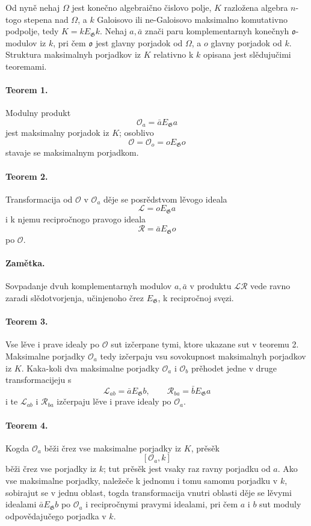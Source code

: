 \documentclass[11pt]{article}
\providecommand{\Gg}{\mathfrak G}
\providecommand{\oo}{\mathfrak o}
\begin{document}
Od nyně nehaj \(\Omega\) jest konečno algebraično čislovo polje, \(K\) razložena algebra \(n\)-togo stepena nad \(\Omega\), a \(k\) Galoisovo ili ne-Galoisovo maksimalno komutativno podpolje, tedy \(K=kE_\Gg k\). Nehaj \(a,\bar a\) znači paru komplementarnyh konečnyh \(\oo\)-modulov iz \(k\), pri čem \(\oo\) jest glavny porjadok od \(\Omega\), a \(o\) glavny porjadok od \(k\). Struktura maksimalnyh porjadkov iz \(K\) relativno k \(k\) opisana jest slědujučimi teoremami.

\paragraph{Teorem 1.}
Modulny produkt
\[
        \mathcal O_a=\bar a E_\Gg a
\]
jest maksimalny porjadok iz \(K\); osoblivo
\[
        \mathcal O=\mathcal O_o=oE_\Gg o
\]
stavaje se maksimalnym porjadkom.

\paragraph{Teorem 2.}
Transformacija od \(\mathcal O\) v \(\mathcal O_a\) děje se posrědstvom lěvogo ideala
\[
        \mathcal L=oE_\Gg a
\]
i k njemu recipročnogo pravogo ideala
\[
        \mathcal R=\bar a E_\Gg o
\]
po \(\mathcal O\).

\paragraph{Zamětka.}
Sovpadanje dvuh komplementarnyh modulov \(a,\bar a\) v produktu \(\mathcal L\mathcal R\) vede ravno zaradi slědotvorjenja, učinjenoho črez \(E_\Gg\), k recipročnoj svęzi.

\paragraph{Teorem 3.}
Vse lěve i prave idealy po \(\mathcal O\) sut izčerpane tymi, ktore ukazane sut v teoremu 2. Maksimalne porjadky \(\mathcal O_a\) tedy izčerpaju vsu sovokupnost maksimalnyh porjadkov iz \(K\). Kaka-koli dva maksimalne porjadky \(\mathcal O_a\) i \(\mathcal O_b\) prěhodet jedne v druge transformacijeju s
\[
        \mathcal L_{ab}=\bar aE_\Gg b,
        \qquad
        \mathcal R_{ba}=\bar bE_\Gg a
\]
i te \(\mathcal L_{ab}\) i \(\mathcal R_{ba}\) izčerpaju lěve i prave idealy po \(\mathcal O_a\).

\paragraph{Teorem 4.}
Kogda \(\mathcal O_a\) běži črez vse maksimalne porjadky iz \(K\), prěsěk
\[
        [\mathcal O_a,k]
\]
běži črez vse porjadky iz \(k\); tut prěsěk jest vsaky raz ravny porjadku od \(a\). Ako vse maksimalne porjadky, naležeče k jednomu i tomu samomu porjadku v \(k\), sobirajut se v jednu oblast, togda transformacija vnutri oblasti děje se lěvymi idealami \(\bar aE_\Gg b\) po \(\mathcal O_a\) i recipročnymi pravymi idealami, pri čem \(a\) i \(b\) sut moduly odpovědajučego porjadka v \(k\).
\end{document}
